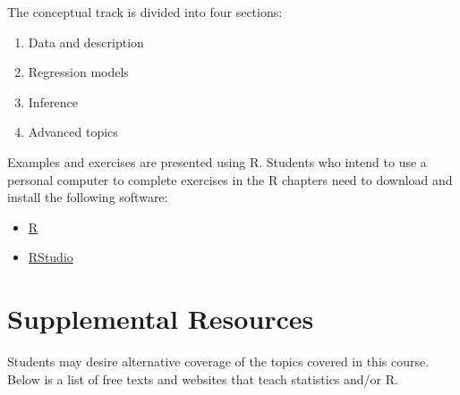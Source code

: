 \documentclass[
]{book}
\providecommand{\tightlist}{%
  \setlength{\itemsep}{0pt}\setlength{\parskip}{0pt}}
\begin{document}
The conceptual track is divided into four sections:

\begin{enumerate}
\def\labelenumi{\arabic{enumi}.}
\tightlist
\item
  Data and description
\item
  Regression models
\item
  Inference
\item
  Advanced topics
\end{enumerate}

Examples and exercises are presented using R. Students who intend to use a personal computer to complete exercises in the R chapters need to download and install the following software:

\begin{itemize}
\tightlist
\item
  \href{https://cloud.r-project.org}{R}
\item
  \href{https://rstudio.com/products/rstudio/download/}{RStudio}
\end{itemize}

\hypertarget{supplemental-resources}{%
\section*{Supplemental Resources}\label{supplemental-resources}}


Students may desire alternative coverage of the topics covered in this course. Below is a list of free texts and websites that teach statistics and/or R.
\end{document}
